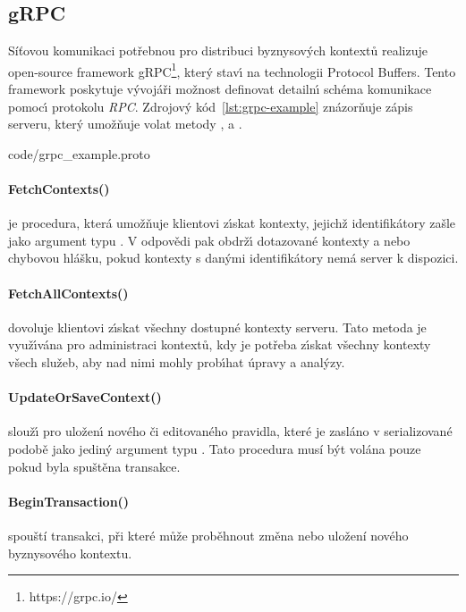 \subsection{gRPC}

Síťovou komunikaci potřebnou pro distribuci byznysových kontextů realizuje
open-source framework gRPC\footnote{https://grpc.io/}, kter\'y stav\'{\i}
na technologii Protocol Buffers. Tento framework poskytuje v\'yvojáři
možnost definovat detailn\'{\i} schéma komunikace pomoc\'{\i} protokolu \textit{\gls{RPC}}.
Zdrojov\'y kód~\ref{lst:grpc-example} znázorňuje zápis serveru,
kter\'y umožňuje volat metody ,
 a .


{code/grpc_example.proto}

\paragraph{FetchContexts()} je procedura, která umožňuje klientovi
z\'{\i}skat kontexty, jejichž identifikátory zašle jako argument
typu .
V odpovědi pak obdrž\'{\i} dotazované kontexty a nebo chybovou hlášku,
pokud kontexty s dan\'ymi identifikátory nemá server k dispozici.

\paragraph{FetchAllContexts()} dovoluje klientovi z\'{\i}skat všechny
dostupné kontexty serveru. Tato metoda je využ\'{\i}vána pro administraci
kontextů, kdy je potřeba z\'{\i}skat všechny kontexty všech služeb, aby
nad nimi mohly prob\'{\i}hat úpravy a anal\'yzy.

\paragraph{UpdateOrSaveContext()} slouž\'{\i} pro uložen\'{\i} nového či
editovaného pravidla, které je zasláno v serializované podobě
jako jedin\'y argument typu .
Tato procedura musí být volána pouze pokud byla spuštěna transakce.

\paragraph{BeginTransaction()} spouští transakci, při které může proběhnout
změna nebo uložení nového byznysového kontextu.

